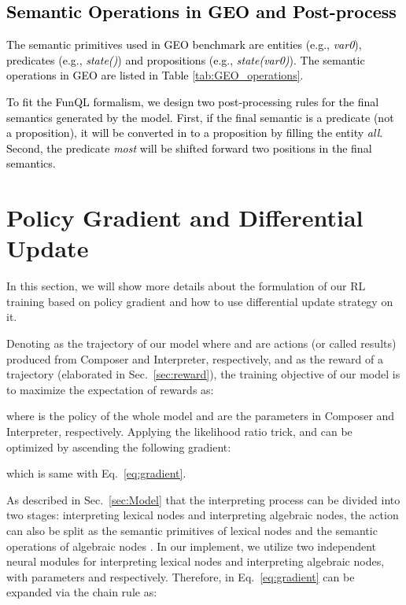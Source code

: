 \documentclass[11pt,a4paper]{article}
\newcommand{\An}[1]{\textcolor{black}{#1}}
\begin{document}
\An{\section{Semantic Operations in GEO and Post-process}}

\An{The semantic primitives used in GEO benchmark are entities (e.g., \textit{var0}), predicates (e.g., \textit{state()}) and propositions (e.g., \textit{state(var0)}).
The semantic operations in GEO are listed in Table \ref{tab:GEO_operations}.}

\An{To fit the FunQL formalism, we design two post-processing rules for the final semantics generated by the model.
First, if the final semantic is a predicate (not a proposition), it will be converted in to a proposition by filling the entity \textit{all}. 
Second, the predicate \textit{most} will be shifted forward two positions in the final semantics.}





\section{Policy Gradient and Differential Update}

In this section, we will show more details about the formulation of our RL training based on policy gradient and how to use differential update strategy on it.

Denoting  as the trajectory of our model where  and  are actions (or called results) produced from Composer and Interpreter, respectively, and  as the reward of a trajectory  (elaborated in Sec.~\ref{sec:reward}), 
the training objective of our model is to maximize the expectation of rewards as:

where  is the policy of the whole model  and  are the parameters in Composer and Interpreter, respectively.
Applying the likelihood ratio trick,  and  can be optimized by ascending the following gradient:

which is same with Eq.~\ref{eq:gradient}.

As described in Sec.~\ref{sec:Model} that the interpreting process can be divided into two stages: interpreting lexical nodes and interpreting algebraic nodes, the action  can also be split as the semantic primitives of lexical nodes  and the semantic operations of algebraic nodes .
In our implement, we utilize two independent neural modules for interpreting lexical nodes and interpreting algebraic nodes, with parameters  and  respectively.
Therefore,  in Eq.~\ref{eq:gradient} can be expanded via the chain rule as:
\end{document}
